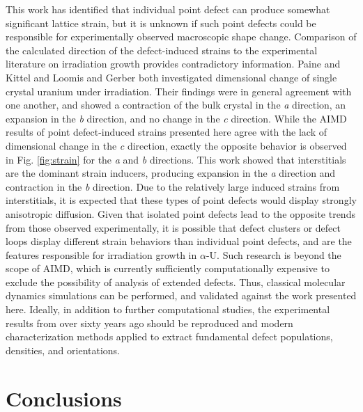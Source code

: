 \documentclass[utf8]{frontiersSCNS} %
\begin{document}
This work has identified that individual point defect can produce somewhat significant lattice strain, but it is unknown if such point defects could be responsible for experimentally observed macroscopic shape change. Comparison of the calculated direction of the defect-induced strains to the experimental literature on irradiation growth provides contradictory information. Paine and Kittel \cite{paine1958} and Loomis and Gerber \cite{loomis1968} both investigated dimensional change of single crystal uranium under irradiation. Their findings were in general agreement with one another, and showed a contraction of the bulk crystal in the \textit{a} direction, an expansion in the \textit{b} direction, and no change in the \textit{c} direction. While the AIMD results of point defect-induced strains presented here agree with the lack of dimensional change in the \textit{c} direction, exactly the opposite behavior is observed in Fig. \ref{fig:strain} for the \textit{a} and \textit{b} directions. This work showed that interstitials are the dominant strain inducers, producing expansion in the \textit{a} direction and contraction in the \textit{b} direction. Due to the relatively large induced strains from interstitials, it is expected that these types of point defects would display strongly anisotropic diffusion. Given that isolated point defects lead to the opposite trends from those observed experimentally, it is possible that defect clusters or defect loops display different strain behaviors than individual point defects, and are the features responsible for irradiation growth in $\alpha$-U. Such research is beyond the scope of AIMD, which is currently sufficiently computationally expensive to exclude the possibility of analysis of extended defects. Thus, classical molecular dynamics simulations can be performed, and validated against the work presented here. Ideally, in addition to further computational studies, the experimental results from over sixty years ago should be reproduced and modern characterization methods applied to extract fundamental defect populations, densities, and orientations. 

\FloatBarrier

\section{Conclusions}
\end{document}

